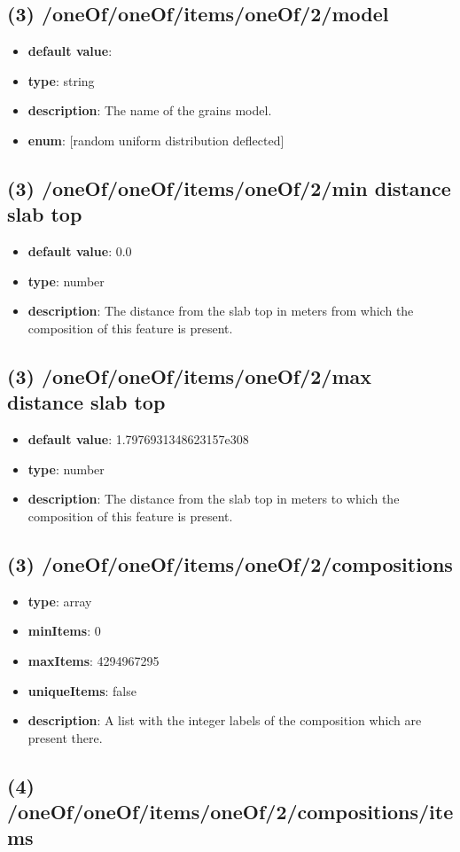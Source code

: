 \subsection{(3) /oneOf/oneOf/items/oneOf/2/model}
\begin{itemize}[leftmargin=3em]\item {\bf default value}: 
\item {\bf type}: string
\item {\bf description}: The name of the grains model.
\item {\bf enum}: [random uniform distribution deflected]\end{itemize}\subsection{(3) /oneOf/oneOf/items/oneOf/2/min distance slab top}
\begin{itemize}[leftmargin=3em]\item {\bf default value}: 0.0
\item {\bf type}: number
\item {\bf description}: The distance from the slab top in meters from which the composition of this feature is present.
\end{itemize}\subsection{(3) /oneOf/oneOf/items/oneOf/2/max distance slab top}
\begin{itemize}[leftmargin=3em]\item {\bf default value}: 1.7976931348623157e308
\item {\bf type}: number
\item {\bf description}: The distance from the slab top in meters to which the composition of this feature is present.
\end{itemize}\subsection{(3) /oneOf/oneOf/items/oneOf/2/compositions}
\begin{itemize}[leftmargin=3em]\item {\bf type}: array
\item {\bf minItems}: 0
\item {\bf maxItems}: 4294967295
\item {\bf uniqueItems}: false
\item {\bf description}: A list with the integer labels of the composition which are present there.
\end{itemize}\subsection{(4) /oneOf/oneOf/items/oneOf/2/compositions/items}
